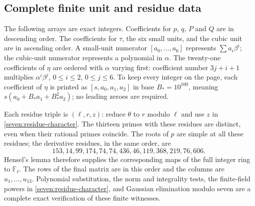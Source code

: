 \subsection{Complete finite unit and residue data}
\label{seven:finite-data}

The following arrays are exact integers. Coefficients for $p$, $q$, $P$ and
$Q$ are in descending order. The coefficients for $\tau$, the six small
units, and the cubic unit are in ascending order. A small-unit numerator
$[a_0,\ldots,a_6]$ represents $\sum a_i\beta^i$; the cubic-unit numerator
represents a polynomial in $\alpha$.
The twenty-one coefficients of $\eta$ are ordered with $\alpha$ varying
first: coefficient number $3j+i+1$ multiplies $\alpha^i\beta^j$,
$0\le i\le2$, $0\le j\le6$.
To keep every integer on the page, each coefficient of $\eta$ is printed as
$[s,a_0,a_1,a_2]$ in base $B_*=10^{100}$, meaning
$s(a_0+B_*a_1+B_*^2a_2)$; no leading zeroes are required.

Each residue triple is $(\ell,r,z)$: reduce $\theta$ to $r$ modulo $\ell$
and use $z$ in \eqref{seven:residue-character}. The thirteen primes with
these residues are distinct, even when their rational primes coincide.
The roots of $p$ are simple at all these residues; the derivative residues,
in the same order, are
\[
 153,14,99,174,74,74,436,46,119,368,219,76,606.
\]
Hensel's lemma therefore supplies the corresponding maps of the full
integer ring to $\mathbb F_\ell$.
The rows of the final matrix are in this order and the columns are
$u_1,\ldots,u_{13}$.
Polynomial substitution, the norm and integrality tests, the finite-field
powers in \eqref{seven:residue-character}, and Gaussian elimination modulo
seven are a complete exact verification of these finite witnesses.

